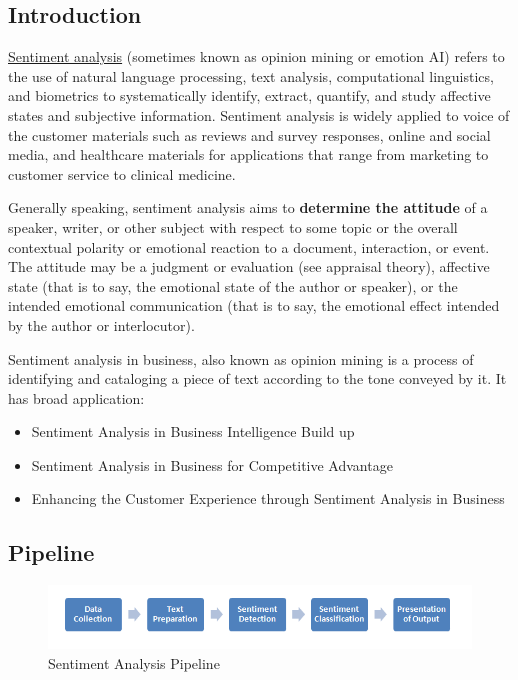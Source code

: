\documentclass[letterpaper,11pt,english]{sphinxmanual}
\begin{document}
\subsection{Introduction}
\label{textmining:introduction}
\href{https://en.wikipedia.org/wiki/Sentiment\_analysis}{Sentiment analysis} (sometimes known as opinion mining or emotion AI) refers to the use of natural language processing, text analysis, computational linguistics, and biometrics to systematically identify, extract, quantify, and study affective states and subjective information. Sentiment analysis is widely applied to voice of the customer materials such as reviews and survey responses, online and social media, and healthcare materials for applications that range from marketing to customer service to clinical medicine.

Generally speaking, sentiment analysis aims to \textbf{determine the attitude} of a speaker, writer, or other subject with respect to some topic or the overall contextual polarity or emotional reaction to a document, interaction, or event. The attitude may be a judgment or evaluation (see appraisal theory), affective state (that is to say, the emotional state of the author or speaker), or the intended emotional communication (that is to say, the emotional effect intended by the author or interlocutor).

Sentiment analysis in business, also known as opinion mining is a process of identifying and cataloging a piece of text according to the tone conveyed by it. It has broad application:
\begin{itemize}
\item {} 
Sentiment Analysis in Business Intelligence Build up

\item {} 
Sentiment Analysis in Business for Competitive Advantage

\item {} 
Enhancing the Customer Experience through Sentiment Analysis in Business

\end{itemize}


\subsection{Pipeline}
\label{textmining:pipeline}\begin{figure}[htbp]
\centering
\capstart

\includegraphics{sentiment_analysis_pipeline.png}
\caption{Sentiment Analysis Pipeline}\label{textmining:fig-sa-pipeline}\end{figure}
\end{document}
